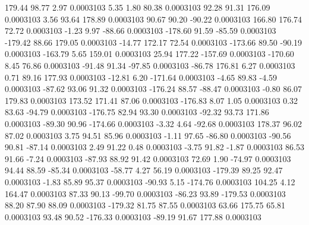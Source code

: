       179.44       98.77        2.97     0.0003103
        5.35        1.80       80.38     0.0003103
       92.28       91.31      176.09     0.0003103
        3.56       93.64      178.89     0.0003103
       90.67       90.20      -90.22     0.0003103
      166.80      176.74       72.72     0.0003103
       -1.23        9.97      -88.66     0.0003103
     -178.60       91.59      -85.59     0.0003103
     -179.42       88.66      179.05     0.0003103
      -14.77      172.17       72.54     0.0003103
     -173.66       89.50      -90.19     0.0003103
     -163.79        5.65      159.01     0.0003103
       25.94      177.22     -157.69     0.0003103
     -170.60        8.45       76.86     0.0003103
      -91.48       91.34      -97.85     0.0003103
      -86.78      176.81        6.27     0.0003103
        0.71       89.16      177.93     0.0003103
      -12.81        6.20     -171.64     0.0003103
       -4.65       89.83       -4.59     0.0003103
      -87.62       93.06       91.32     0.0003103
     -176.24       88.57      -88.47     0.0003103
       -0.80       86.07      179.83     0.0003103
      173.52      171.41       87.06     0.0003103
     -176.83        8.07        1.05     0.0003103
        0.32       83.63      -94.79     0.0003103
     -176.75       82.94       93.30     0.0003103
      -92.32       93.73      171.86     0.0003103
      -89.30       90.96     -174.66     0.0003103
       -3.32        4.64      -92.68     0.0003103
      178.37       96.02       87.02     0.0003103
        3.75       94.51       85.96     0.0003103
       -1.11       97.65      -86.80     0.0003103
      -90.56       90.81      -87.14     0.0003103
        2.49       91.22        0.48     0.0003103
       -3.75       91.82       -1.87     0.0003103
       86.53       91.66       -7.24     0.0003103
      -87.93       88.92       91.42     0.0003103
       72.69        1.90      -74.97     0.0003103
       94.44       88.59      -85.34     0.0003103
      -58.77        4.27       56.19     0.0003103
     -179.39       89.25       92.47     0.0003103
       -1.83       85.89       95.37     0.0003103
      -90.93        5.15     -174.76     0.0003103
      104.25        4.12      164.47     0.0003103
       87.33       90.13      -99.70     0.0003103
      -86.23       93.89     -179.53     0.0003103
       88.20       87.90       88.09     0.0003103
     -179.32       81.75       87.55     0.0003103
       63.66      175.75       65.81     0.0003103
       93.48       90.52     -176.33     0.0003103
      -89.19       91.67      177.88     0.0003103
